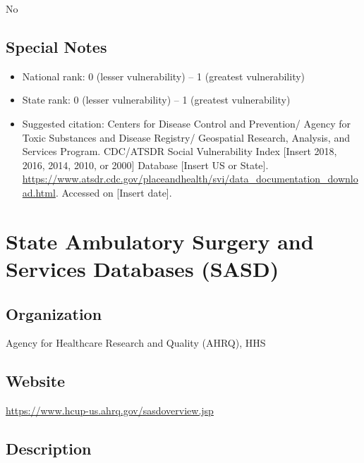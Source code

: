 \documentclass[
]{book}
\providecommand{\tightlist}{%
  \setlength{\itemsep}{0pt}\setlength{\parskip}{0pt}}
\begin{document}
No

\hypertarget{special-notes-81}{%
\section{Special Notes}\label{special-notes-81}}

\begin{itemize}
\tightlist
\item
  National rank: 0 (lesser vulnerability) -- 1 (greatest vulnerability)
\item
  State rank: 0 (lesser vulnerability) -- 1 (greatest vulnerability)
\item
  Suggested citation: Centers for Disease Control and Prevention/ Agency for Toxic Substances and Disease Registry/ Geospatial Research, Analysis, and Services Program. CDC/ATSDR Social Vulnerability Index {[}Insert 2018, 2016, 2014, 2010, or 2000{]} Database {[}Insert US or State{]}. \url{https://www.atsdr.cdc.gov/placeandhealth/svi/data_documentation_download.html}. Accessed on {[}Insert date{]}.
\end{itemize}

\mainmatter

\hypertarget{state-ambulatory-surgery-and-services-databases-sasd}{%
\chapter{State Ambulatory Surgery and Services Databases (SASD)}\label{state-ambulatory-surgery-and-services-databases-sasd}}

\hypertarget{organization-82}{%
\section{Organization}\label{organization-82}}

Agency for Healthcare Research and Quality (AHRQ), HHS

\hypertarget{website-82}{%
\section{Website}\label{website-82}}

\url{https://www.hcup-us.ahrq.gov/sasdoverview.jsp}

\hypertarget{description-82}{%
\section{Description}\label{description-82}}
\end{document}
